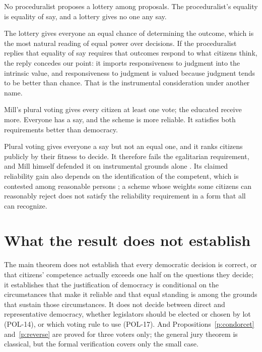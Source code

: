 \documentclass{situationist-preprint}
\begin{document}
\begin{objection}
No proceduralist proposes a lottery among proposals. The proceduralist's equality is equality of say, and a lottery gives no one any say.
\end{objection}

\begin{reply}
The lottery gives everyone an equal chance of determining the outcome, which is the most natural reading of equal power over decisions. If the proceduralist replies that equality of say requires that outcomes respond to what citizens think, the reply concedes our point: it imports responsiveness to judgment into the intrinsic value, and responsiveness to judgment is valued because judgment tends to be better than chance. That is the instrumental consideration under another name.
\end{reply}

\begin{objection}
Mill's plural voting gives every citizen at least one vote; the educated receive more. Everyone has a say, and the scheme is more reliable. It satisfies both requirements better than democracy.
\end{objection}

\begin{reply}
Plural voting gives everyone a say but not an equal one, and it ranks citizens publicly by their fitness to decide. It therefore fails the egalitarian requirement, and Mill himself defended it on instrumental grounds alone \citep[ch.~VIII]{MillCRG}. Its claimed reliability gain also depends on the identification of the competent, which is contested among reasonable persons \citep{Estlund2008}; a scheme whose weights some citizens can reasonably reject does not satisfy the reliability requirement in a form that all can recognize.
\end{reply}

\section{What the result does not establish}

The main theorem does not establish that every democratic decision is correct, or that citizens' competence actually exceeds one half on the questions they decide; it establishes that the justification of democracy is conditional on the circumstances that make it reliable and that equal standing is among the grounds that sustain those circumstances. It does not decide between direct and representative democracy, whether legislators should be elected or chosen by lot (POL-14), or which voting rule to use (POL-17). And Propositions~\ref{p:condorcet} and~\ref{p:reverse} are proved for three voters only; the general jury theorem is classical, but the formal verification covers only the small case.
\end{document}

